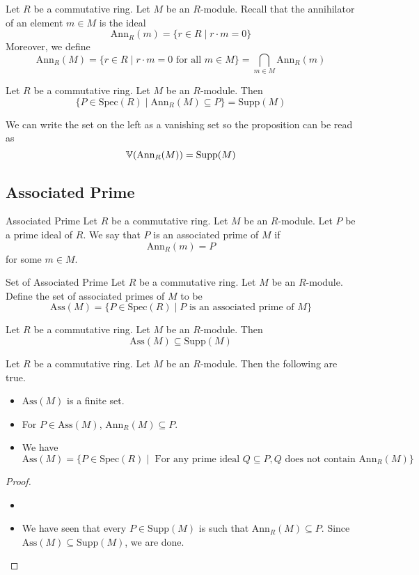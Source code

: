 \documentclass[a4paper]{article}
\begin{document}
Let $R$ be a commutative ring. Let $M$ be an $R$-module. Recall that the annihilator of an element $m\in M$ is the ideal $$\text{Ann}_R(m)=\{r\in R\;|\;r\cdot m=0\}$$ Moreover, we define $$\text{Ann}_R(M)=\{r\in R\;|\;r\cdot m=0\text{ for all }m\in M\}=\bigcap_{m\in M}\text{Ann}_R(m)$$

\begin{prp}{}{} Let $R$ be a commutative ring. Let $M$ be an $R$-module. Then $$\{P\in\text{Spec}(R)\;|\;\text{Ann}_R(M)\subseteq P\}=\text{Supp}(M)$$
\end{prp}

We can write the set on the left as a vanishing set so the proposition can be read as $$\mathbb{V}(\text{Ann}_R(M))=\text{Supp}(M)$$

\subsection{Associated Prime}
\begin{defn}{Associated Prime}{} Let $R$ be a commutative ring. Let $M$ be an $R$-module. Let $P$ be a prime ideal of $R$. We say that $P$ is an associated prime of $M$ if $$\text{Ann}_R(m)=P$$ for some $m\in M$. 
\end{defn}

\begin{defn}{Set of Associated Prime}{} Let $R$ be a commutative ring. Let $M$ be an $R$-module. Define the set of associated primes of $M$ to be $$\text{Ass}(M)=\{P\in\text{Spec}(R)\;|\;P\text{ is an associated prime of }M\}$$
\end{defn}

\begin{prp}{}{} Let $R$ be a commutative ring. Let $M$ be an $R$-module. Then $$\text{Ass}(M)\subseteq\text{Supp}(M)$$
\end{prp}

\begin{prp}{}{} Let $R$ be a commutative ring. Let $M$ be an $R$-module. Then the following are true. 
\begin{itemize}
\item $\text{Ass}(M)$ is a finite set. 
\item For $P\in\text{Ass}(M)$, $\text{Ann}_R(M)\subseteq P$. 
\item We have $$\text{Ass}(M)=\{P\in\text{Spec}(R)\;|\;\text{ For any prime ideal }Q\subseteq P, Q\text{ does not contain }\text{Ann}_R(M)\}$$
\end{itemize} \tcbline
\begin{proof}~\\
\begin{itemize}
\item 
\item We have seen that every $P\in\text{Supp}(M)$ is such that $\text{Ann}_R(M)\subseteq P$. Since $\text{Ass}(M)\subseteq\text{Supp}(M)$, we are done. 
\end{itemize}
\end{proof}
\end{prp}
\end{document}

